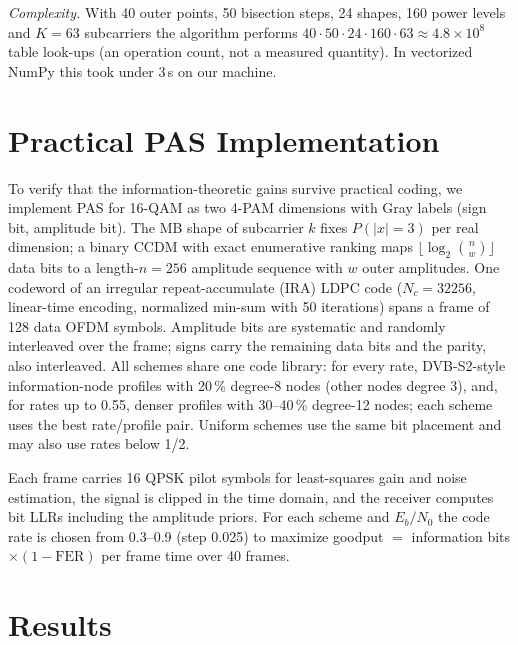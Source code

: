 \documentclass[conference]{IEEEtran}
\begin{document}
\textit{Complexity.} With 40 outer points, 50 bisection steps, 24 shapes, 160 power levels and $K=63$ subcarriers the algorithm performs $40\cdot50\cdot24\cdot160\cdot63\approx4.8\times10^{8}$ table look-ups (an operation count, not a measured quantity). In vectorized NumPy this took under 3\,s on our machine.

\section{Practical PAS Implementation}\label{sec:pas}
To verify that the information-theoretic gains survive practical coding, we implement PAS for 16-QAM as two 4-PAM dimensions with Gray labels (sign bit, amplitude bit). The MB shape of subcarrier $k$ fixes $P(|x|=3)$ per real dimension; a binary CCDM with exact enumerative ranking maps $\lfloor\log_2\binom{n}{w}\rfloor$ data bits to a length-$n=256$ amplitude sequence with $w$ outer amplitudes. One codeword of an irregular repeat-accumulate (IRA) LDPC code ($N_c=32256$, linear-time encoding, normalized min-sum with 50 iterations) spans a frame of 128 data OFDM symbols. Amplitude bits are systematic and randomly interleaved over the frame; signs carry the remaining data bits and the parity, also interleaved. All schemes share one code library: for every rate, DVB-S2-style information-node profiles with 20\,\% degree-8 nodes (other nodes degree 3), and, for rates up to 0.55, denser profiles with 30--40\,\% degree-12 nodes; each scheme uses the best rate/profile pair. Uniform schemes use the same bit placement and may also use rates below 1/2.

Each frame carries 16 QPSK pilot symbols for least-squares gain and noise estimation, the signal is clipped in the time domain, and the receiver computes bit LLRs including the amplitude priors. For each scheme and $E_b/N_0$ the code rate is chosen from 0.3--0.9 (step 0.025) to maximize goodput $=$ information bits $\times(1-\mathrm{FER})$ per frame time over 40 frames.

\section{Results}\label{sec:results}
\end{document}
